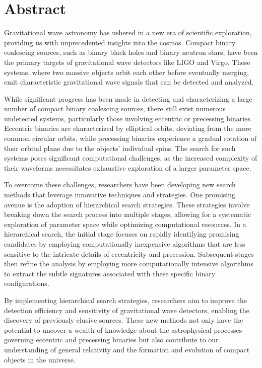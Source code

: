 \chapter{Abstract}
\vspace*{-0.75cm}
Gravitational wave astronomy has ushered in a new era of scientific exploration, providing us with unprecedented insights into the cosmos. Compact binary coalescing sources, such as binary black holes and binary neutron stars, have been the primary targets of gravitational wave detectors like LIGO and Virgo. These systems, where two massive objects orbit each other before eventually merging, emit characteristic gravitational wave signals that can be detected and analyzed.

While significant progress has been made in detecting and characterizing a large number of compact binary coalescing sources, there still exist numerous undetected systems, particularly those involving eccentric or precessing binaries. Eccentric binaries are characterized by elliptical orbits, deviating from the more common circular orbits, while precessing binaries experience a gradual rotation of their orbital plane due to the objects' individual spins. The search for such systems poses significant computational challenges, as the increased complexity of their waveforms necessitates exhaustive exploration of a larger parameter space.

To overcome these challenges, researchers have been developing new search methods that leverage innovative techniques and strategies. One promising avenue is the adoption of hierarchical search strategies. These strategies involve breaking down the search process into multiple stages, allowing for a systematic exploration of parameter space while optimizing computational resources. In a hierarchical search, the initial stage focuses on rapidly identifying promising candidates by employing computationally inexpensive algorithms that are less sensitive to the intricate details of eccentricity and precession. Subsequent stages then refine the analysis by employing more computationally intensive algorithms to extract the subtle signatures associated with these specific binary configurations.

By implementing hierarchical search strategies, researchers aim to improve the detection efficiency and sensitivity of gravitational wave detectors, enabling the discovery of previously elusive sources. These new methods not only have the potential to uncover a wealth of knowledge about the astrophysical processes governing eccentric and precessing binaries but also contribute to our understanding of general relativity and the formation and evolution of compact objects in the universe.

